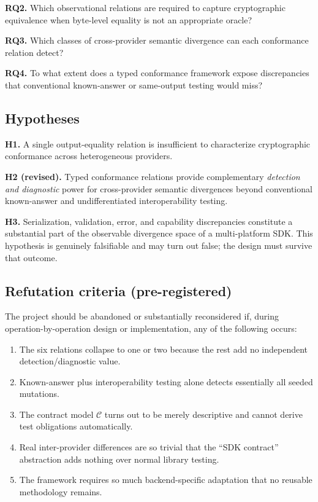 \documentclass[11pt,a4paper]{article}
\begin{document}
\textbf{RQ2.} Which observational relations are required to capture cryptographic equivalence when byte-level equality is not an appropriate oracle?

\textbf{RQ3.} Which classes of cross-provider semantic divergence can each conformance relation detect?

\textbf{RQ4.} To what extent does a typed conformance framework expose discrepancies that conventional known-answer or same-output testing would miss?

\subsection{Hypotheses}
\textbf{H1.} A single output-equality relation is insufficient to characterize cryptographic conformance across heterogeneous providers.

\textbf{H2 (revised).} Typed conformance relations provide complementary \emph{detection and diagnostic} power for cross-provider semantic divergences beyond conventional known-answer and undifferentiated interoperability testing.

\textbf{H3.} Serialization, validation, error, and capability discrepancies constitute a substantial part of the observable divergence space of a multi-platform SDK. This hypothesis is genuinely falsifiable and may turn out false; the design must survive that outcome.

\subsection{Refutation criteria (pre-registered)}
The project should be abandoned or substantially reconsidered if, during operation-by-operation design or implementation, any of the following occurs:
\begin{enumerate}
\item The six relations collapse to one or two because the rest add no independent detection/diagnostic value.
\item Known-answer plus interoperability testing alone detects essentially all seeded mutations.
\item The contract model $\mathcal{C}$ turns out to be merely descriptive and cannot derive test obligations automatically.
\item Real inter-provider differences are so trivial that the ``SDK contract'' abstraction adds nothing over normal library testing.
\item The framework requires so much backend-specific adaptation that no reusable methodology remains.
\end{enumerate}
\end{document}
